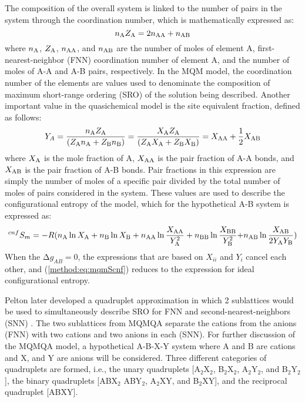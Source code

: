 The composition of the overall system is linked to the number of pairs in the system through the coordination number, which is mathematically expressed as:
\begin{equation} \label{method:eq:mqmZa}
    n_{\rm A}Z_{\rm A}={2n}_{\rm AA}+n_{\rm AB}
\end{equation}
where $n_{\rm A}$, $Z_{\rm A}$, $n_{\rm AA}$, and $n_{\rm AB}$ are the number of moles of element A, first-nearest-neighbor (FNN) coordination number of element A, and the number of moles of A-A and A-B pairs, respectively. In the MQM model, the coordination number of the elements are values used to denominate the composition of maximum short-range ordering (SRO) of the solution being described. Another important value in the quasichemical model is the site equivalent fraction, defined as follows:
\begin{equation} \label{method:eq:mqmYa}
    Y_A=\frac{n_{\rm A}Z_{\rm A}}{(Z_{\rm A}n_{\rm A}+Z_{\rm B}n_{\rm B})}=\frac{X_{\rm A}Z_{\rm A}}{(Z_{\rm A}X_{\rm A}+Z_{\rm B}X_{\rm B})}=X_{\rm AA}+\frac{1}{2}X_{\rm AB}
\end{equation}
where $X_{\rm A}$ is the mole fraction of A, $X_{\rm AA}$ is the pair fraction of A-A bonds, and $X_{\rm AB}$ is the pair fraction of A-B bonds. Pair fractions in this expression are simply the number of moles of a specific pair divided by the total number of moles of pairs considered in the system. These values are used to describe the configurational entropy of the model, which for the hypothetical A-B system is expressed as:
\begin{equation} \label{method:eq:mqmScnf}
    ^{cnf}S_m=-R(n_{\rm A}\ln X_{\rm A}+n_{\rm B}\ln X_{\rm B}+n_{\rm AA}\ln \frac{X_{\rm AA}}{Y_{\rm A}^2}+n_{\rm BB}\ln \frac{X_{\rm BB}}{Y_{\rm B}^2}{+n}_{\rm AB}\ln \frac{X_{\rm AB}}{2Y_{\rm A}Y_{\rm B}})
\end{equation}
When the $\mathrm{\Delta}g_{AB}=0$, the expressions that are based on $X_{ii}$ and $Y_i$ cancel each other, and (\ref{method:eq:mqmScnf}) reduces to the expression for ideal configurational entropy. 

Pelton later developed a quadruplet approximation in which 2 sublattices would be used to simultaneously describe SRO for FNN and second-nearest-neighbors (SNN) \cite{pelton2018phase, poschmann2021recent}. The two sublattices from MQMQA separate the cations from the anions (FNN) with two cations and two anions in each (SNN). For further discussion of the MQMQA model, a hypothetical A-B-X-Y system where A and B are cations and X, and Y are anions will be considered. Three different categories of quadruplets are formed, i.e., the unary quadruplets [A$_2$X$_2$, B$_2$X$_2$, A$_2$Y$_2$, and B$_2$Y$_2$], the binary quadruplets [ABX$_2$ ABY$_2$, A$_2$XY, and B$_2$XY], and the reciprocal quadruplet [ABXY]. 

